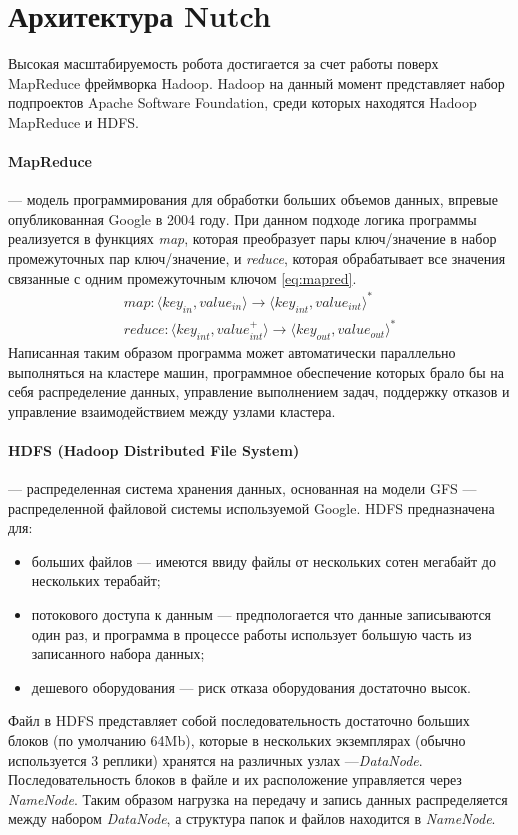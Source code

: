 \section{Архитектура Nutch}
Высокая масштабируемость робота достигается за счет работы поверх MapReduce фреймворка Hadoop\cite{hadoopdefguide}. Hadoop на данный момент представляет набор подпроектов Apache Software Foundation, среди которых находятся Hadoop MapReduce и HDFS. 
\paragraph{MapReduce} --- модель программирования для обработки больших объемов данных, впревые опубликованная\cite{googlemr} Google в 2004 году. При данном подходе логика программы реализуется в функциях \textit{map}, которая преобразует пары ключ/значение в набор промежуточных пар ключ/значение, и \textit{reduce}, которая обрабатывает все значения связанные с одним промежуточным ключом \ref{eq:mapred}.
\begin{equation}\label{eq:mapred}
\begin{split}
map:\langle key_{in}, value_{in}\rangle\rightarrow\langle key_{int}, value_{int}\rangle^{*} \\
reduce:\langle key_{int}, value_{int}^{+}\rangle\rightarrow\langle key_{out}, value_{out}\rangle^{*}
\end{split}
\end{equation}
Написанная таким образом программа может автоматически параллельно выполняться на кластере машин, программное обеспечение которых брало бы на себя распределение данных, управление выполнением задач, поддержку отказов и управление взаимодействием между узлами кластера. 
\paragraph{HDFS (Hadoop Distributed File System)} --- распределенная система хранения данных, основанная на модели GFS\cite{gfs} --- распределенной файловой системы используемой Google. HDFS предназначена для:
\begin{itemize}
 \item больших файлов --- имеются ввиду файлы от нескольких сотен мегабайт до нескольких терабайт;
 \item потокового доступа к данным --- предпологается что данные записываются один раз, и программа в процессе работы использует большую часть из записанного набора данных;
 \item дешевого оборудования --- риск отказа оборудования достаточно высок.
\end{itemize}
Файл в HDFS представляет собой последовательность достаточно больших блоков (по умолчанию 64Mb), которые в нескольких экземплярах (обычно используется 3 реплики) хранятся на различных узлах ---\textit{DataNode}. Последовательность блоков в файле и их расположение управляется через \textit{NameNode}. Таким образом нагрузка на передачу и запись данных распределяется между набором \textit{DataNode}, а структура папок и файлов находится в \textit{NameNode}.

